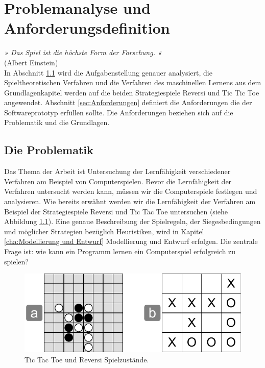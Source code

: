 \chapter{Problemanalyse und Anforderungsdefinition}
\label{cha:pua}

\emph{» Das Spiel ist die höchste Form der Forschung. «} \\
(Albert Einstein) \\

In Abschnitt \ref{sec:Die Problematik} wird die Aufgabenstellung genauer analysiert, die Spieltheoretischen Verfahren und die Verfahren des maschinellen Lernens aus dem Grundlagenkapitel werden auf die beiden Strategiespiele Reversi und Tic Tic Toe angewendet. Abschnitt \ref{sec:Anforderungen} definiert die Anforderungen die der Softwareprototyp erfüllen sollte. Die Anforderungen beziehen sich auf die Problematik und die Grundlagen. 

\section{Die Problematik}
\label{sec:Die Problematik}
Das Thema der Arbeit ist Untersuchung der Lernfähigkeit verschiedener Verfahren am Beispiel von Computerspielen. Bevor die Lernfähigkeit der Verfahren untersucht werden kann, müssen wir die Computerspiele festlegen und analysieren. Wie bereits erwähnt werden wir die Lernfähigkeit der Verfahren am Beispiel der Strategiespiele Reversi und Tic Tac Toe untersuchen (siehe Abbildung \ref{fig:reversi_und_tictactoe}). Eine genaue Beschreibung der Spielregeln, der Siegesbedingungen und möglicher Strategien bezüglich Heuristiken, wird in Kapitel \ref{cha:Modellierung und Entwurf} Modellierung und Entwurf erfolgen. Die zentrale Frage ist: wie kann ein Programm lernen ein Computerspiel erfolgreich zu spielen? \\

\begin{figure}[!htbp]
  \centering
  \includegraphics[scale = 0.8]{inhalt/abbildungen/reversi_und_tictactoe.pdf}
  \caption{Tic Tac Toe und Reversi Spielzustände.}
  \label{fig:reversi_und_tictactoe}
\end{figure} 

